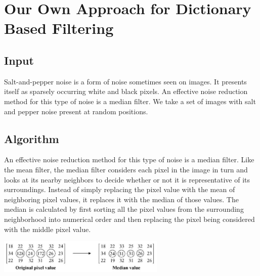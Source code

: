 \documentclass[journal]{IEEEtran}
\begin{document}
	

\section{Our Own Approach for Dictionary Based Filtering}
\subsection{Input}
Salt-and-pepper noise is a form of noise sometimes seen
on images. It presents itself as sparsely occurring white and
black pixels. An effective noise reduction method for this type
of noise is a median filter. We take a set of images with salt and pepper noise present at random positions.
\subsection{Algorithm}
An effective noise reduction method for this type of noise is a median filter. Like the mean filter, the median filter considers each pixel in the image in turn and looks at its nearby neighbors to decide whether or not it is representative of its surroundings. Instead of simply replacing the pixel value with the mean of neighboring pixel values, it replaces it with the median of those values. The median is calculated by first sorting all the pixel values from the surrounding neighborhood into numerical order and then replacing the pixel being considered with the middle pixel value.
\begin{minipage}{\linewidth}
	\centering
	\includegraphics[width=80mm]{1}
\end{minipage} 
\end{document}
